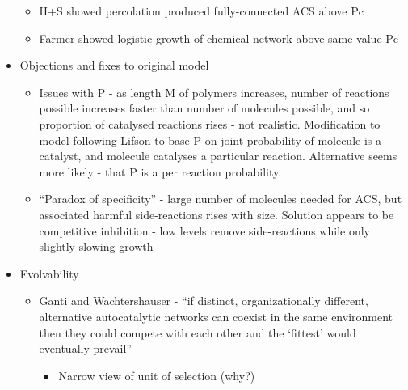 \begin{itemize}
\begin{itemize}
				\item
				
				H+S showed percolation produced fully-connected ACS above Pc
				
				\item
				
				Farmer showed logistic growth of chemical network above same value
				Pc
				
			\end{itemize}
			\item
			
			Objections and fixes to original model
			
			
			\begin{itemize}
				\item
				
				Issues with P - as length M of polymers increases, number of
				reactions possible increases faster than number of molecules
				possible, and so proportion of catalysed reactions rises - not
				realistic. Modification to model following Lifson to base P on joint
				probability of molecule is a catalyst, and molecule catalyses a
				particular reaction. Alternative seems more likely - that P is a per
				reaction probability.
				
				\item
				
				``Paradox of specificity'' - large number of molecules needed for
				ACS, but associated harmful side-reactions rises with size. Solution
				appears to be competitive inhibition - low levels remove
				side-reactions while only slightly slowing growth
				
			\end{itemize}
			\item
			
			Evolvability
			
			
			\begin{itemize}
				\item
				
				Ganti and Wachtershauser - ``if distinct, organizationally
				different, alternative autocatalytic networks can coexist in the
				same environment then they could compete with each other and the
				`fittest' would eventually prevail''
				
				
				\begin{itemize}
					\item
					
					Narrow view of unit of selection (why?)
					

\end{itemize}
\end{itemize}
\end{itemize}
